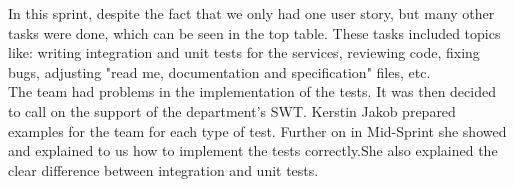 In this sprint, despite the fact that we only had one user story, but many other tasks were done, which can be seen in the top table. These tasks included topics like: writing integration and unit tests for the services, reviewing code, fixing bugs, adjusting "read me, documentation and specification" files, etc.\\

The team had problems in the implementation of the tests. It was then decided to call on the support of the department's SWT. Kerstin Jakob prepared examples for the team for each type of test. Further on in Mid-Sprint she showed and explained to us how to implement the tests correctly.She also explained the clear difference between integration and unit tests. 